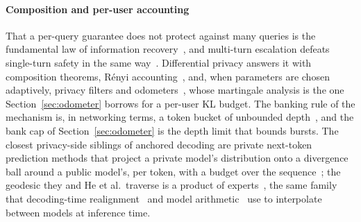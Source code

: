 \paragraph{Composition and per-user accounting}
That a per-query guarantee does not protect against many queries is the fundamental law of information recovery~\cite{dinur2003revealing,dwork2014algorithmic}, and multi-turn escalation defeats single-turn safety in the same way~\cite{russinovich2025crescendo}. Differential privacy answers it with composition theorems, R\'enyi accounting~\cite{mironov2017renyi}, and, when parameters are chosen adaptively, privacy filters and odometers~\cite{rogers2016odometers,whitehouse2023fully}, whose martingale analysis is the one Section~\ref{sec:odometer} borrows for a per-user KL budget. The banking rule of the mechanism is, in networking terms, a token bucket of unbounded depth~\cite{turner1986leaky}, and the bank cap of Section~\ref{sec:odometer} is the depth limit that bounds bursts. The closest privacy-side siblings of anchored decoding are private next-token prediction methods that project a private model's distribution onto a divergence ball around a public model's, per token, with a budget over the sequence~\cite{flemings2024pmixed,flemings2024adaptive,amin2024private,tang2024privacy,thareja2025dpfusion}; the geodesic they and He et al.\ traverse is a product of experts~\cite{hinton2002poe}, the same family that decoding-time realignment~\cite{liu2024dera} and model arithmetic~\cite{dekoninck2024arithmetic} use to interpolate between models at inference time.

